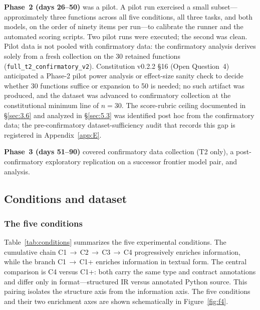 \documentclass[11pt]{article}
\begin{document}
\textbf{Phase~2 (days 26--50)} was a pilot. A pilot run exercised a
small subset---approximately three functions across all five
conditions, all three tasks, and both models, on the order of ninety
items per run---to calibrate the runner and the automated scoring
scripts. Two pilot runs were executed; the second was clean. Pilot
data is not pooled with confirmatory data: the confirmatory analysis
derives solely from a fresh collection on the 30 retained functions
(\texttt{full\_t2\_confirmatory\_v2}).
Constitution v0.2.2 \S16 (Open Question~4) anticipated a Phase-2
pilot power analysis or effect-size sanity check to decide
whether 30 functions suffice or expansion to 50 is needed; no
such artifact was produced, and the dataset was advanced to
confirmatory collection at the constitutional minimum line of
$n = 30$. The score-rubric ceiling documented in \S\ref{sec:3.6}
and analyzed in \S\ref{sec:5.3} was identified post hoc from the
confirmatory data; the pre-confirmatory dataset-sufficiency
audit that records this gap is registered in
Appendix~\ref{app:E}.

\textbf{Phase~3 (days 51--90)} covered confirmatory data collection
(T2 only), a post-confirmatory exploratory replication on a successor
frontier model pair, and analysis.

\subsection{Conditions and dataset}
\label{sec:3.1}

\subsubsection{The five conditions}
\label{sec:3.1.1}
Table~\ref{tab:conditions} summarizes the five experimental conditions.
The cumulative chain C1\,$\to$\,C2\,$\to$\,C3\,$\to$\,C4 progressively
enriches information, while the branch C1\,$\to$\,C1+ enriches
information in textual form. The central comparison is C4 versus C1+:
both carry the same type and contract annotations and differ only in
format---structured IR versus annotated Python source. This pairing
isolates the structure axis from the information axis. The five
conditions and their two enrichment axes are shown schematically in
Figure~\ref{fig:f4}.
\end{document}
